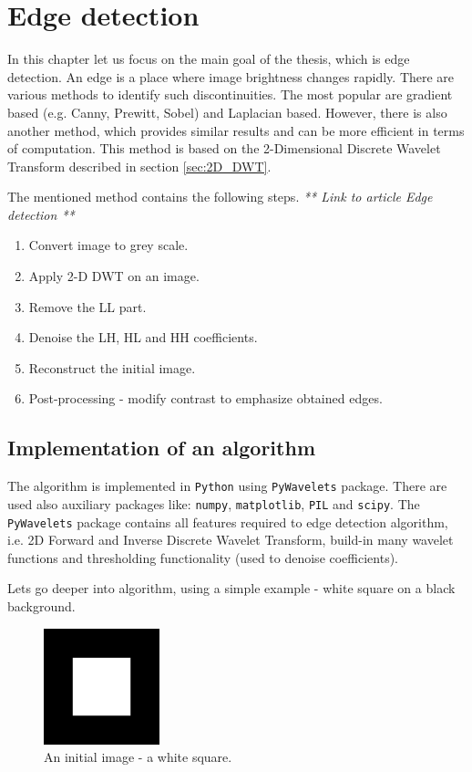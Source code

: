 \chapter{Edge detection}

In this chapter let us focus on the main goal of the thesis, which is edge detection. An edge is a place where image brightness changes rapidly. There are various methods to identify such discontinuities. The most popular are gradient based (e.g. Canny, Prewitt, Sobel) and Laplacian based. However, there is also another method, which provides similar results and can be more efficient in terms of computation. This method is based on the 2-Dimensional Discrete Wavelet Transform described in section \ref{sec:2D_DWT}. \newline

The mentioned method contains the following steps. \textit{** Link to article Edge detection **}
\begin{enumerate}
\item Convert image to grey scale.
\item Apply 2-D DWT on an image.
\item Remove the LL part.
\item Denoise the LH, HL and HH coefficients.
\item Reconstruct the initial image.
\item Post-processing - modify contrast to emphasize obtained edges.
\end{enumerate}

\section{Implementation of an algorithm}

The algorithm is implemented in \texttt{Python} using \texttt{PyWavelets} package. There are used also auxiliary packages like: \texttt{numpy}, \texttt{matplotlib}, \texttt{PIL} and \texttt{scipy}. The \texttt{PyWavelets} package contains all features required to edge detection algorithm, i.e. 2D Forward and Inverse Discrete Wavelet Transform, build-in many wavelet functions and thresholding functionality (used to denoise coefficients).

Lets go deeper into algorithm, using a simple example - white square on a black background.

\begin{figure}[h]
	\centering
	\includegraphics[width=0.3\textwidth]{graphs/square.png}
	\caption{An initial image - a white square.}
\end{figure}

